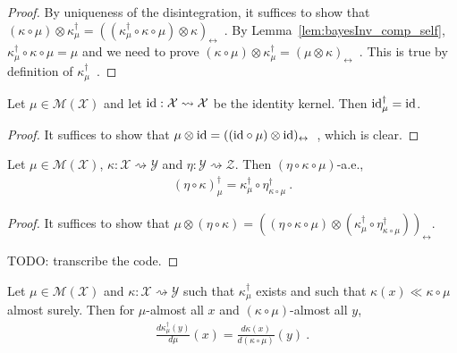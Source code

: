 \begin{proof}\leanok
{}
By uniqueness of the disintegration, it suffices to show that $(\kappa \circ \mu) \otimes \kappa_\mu^\dagger = ((\kappa_\mu^\dagger \circ \kappa \circ \mu) \otimes \kappa)_\leftrightarrow$~.
By Lemma~\ref{lem:bayesInv_comp_self}, $\kappa_\mu^\dagger \circ \kappa \circ \mu = \mu$ and we need to prove $(\kappa \circ \mu) \otimes \kappa_\mu^\dagger = (\mu \otimes \kappa)_\leftrightarrow$~.
This is true by definition of $\kappa_\mu^\dagger$~.
\end{proof}


\begin{lemma}
  \label{lem:bayesInv_id}
  \leanok
  Let $\mu \in \mathcal M (\mathcal X)$ and let $\textup{id} : \mathcal X \rightsquigarrow \mathcal X$ be the identity kernel. Then $\textup{id}_\mu^\dagger = \textup{id}$.
\end{lemma}

\begin{proof}\leanok
{}
It suffices to show that $\mu \otimes \textup{id} = ((\textup{id} \circ \mu) \otimes \textup{id})_\leftrightarrow$~, which is clear.
\end{proof}


\begin{lemma}
  \label{lem:bayesInv_comp}
  \leanok
  Let $\mu \in \mathcal M(\mathcal X)$, $\kappa : \mathcal X \rightsquigarrow \mathcal Y$ and $\eta : \mathcal Y \rightsquigarrow \mathcal Z$. Then $(\eta \circ \kappa \circ \mu)$-a.e.,
  \begin{align*}
  (\eta \circ \kappa)_\mu^\dagger = \kappa_{\mu}^\dagger \circ \eta_{\kappa \circ \mu}^\dagger
  \: .
  \end{align*}
\end{lemma}

\begin{proof}\leanok
{}
It suffices to show that $\mu \otimes (\eta \circ \kappa) = ((\eta \circ \kappa \circ \mu) \otimes (\kappa_{\mu}^\dagger \circ \eta_{\kappa \circ \mu}^\dagger))_\leftrightarrow$.

TODO: transcribe the code.
\end{proof}


\begin{lemma}
  \label{lem:rnDeriv_bayesInv}
  Let $\mu \in \mathcal M(\mathcal X)$ and $\kappa : \mathcal X \rightsquigarrow \mathcal Y$ such that $\kappa_\mu^\dagger$ exists and such that $\kappa(x) \ll \kappa \circ \mu$ almost surely.
  Then for $\mu$-almost all $x$ and $(\kappa \circ \mu)$-almost all $y$,
  \begin{align*}
  \frac{d \kappa_\mu^\dagger(y)}{d \mu}(x) = \frac{d \kappa(x)}{d(\kappa \circ \mu)}(y)
  \: .
  \end{align*}
\end{lemma}

